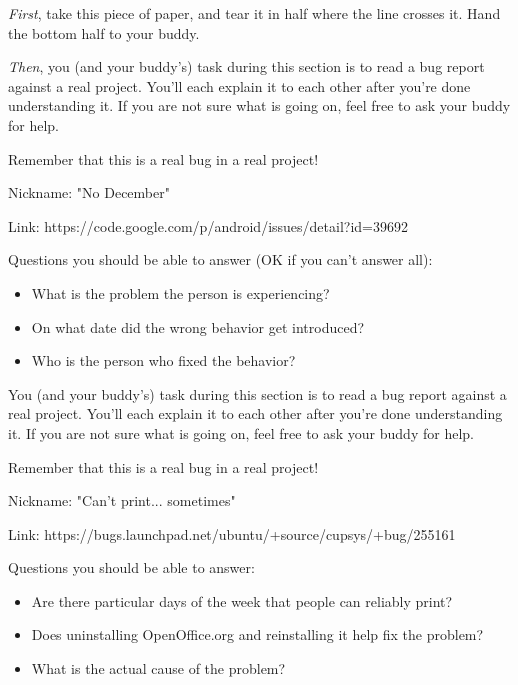 \documentclass[12pt]{article}
\begin{document}
\emph{First}, take this piece of paper, and tear it in half
where the line crosses it. Hand the bottom half to your buddy.

\emph{Then}, you (and your buddy's) task during this section is to
read a bug report against a real project. You'll each explain it to
each other after you're done understanding it. If you are not sure
what is going on, feel free to ask your buddy for help.

Remember that this is a real bug in a real project!

Nickname: "No December"

Link: https://code.google.com/p/android/issues/detail?id=39692

Questions you should be able to answer (OK if you can't answer all):

\begin{itemize}
\item What is the problem the person is experiencing?
\item On what date did the wrong behavior get introduced?
\item Who is the person who fixed the behavior?
\end{itemize}

\hrulefill

You (and your buddy's) task during this section is to read a bug
report against a real project. You'll each explain it to each other
after you're done understanding it. If you are not sure what is going
on, feel free to ask your buddy for help.

Remember that this is a real bug in a real project!

Nickname: "Can't print... sometimes"

Link: https://bugs.launchpad.net/ubuntu/+source/cupsys/+bug/255161

Questions you should be able to answer:

\begin{itemize}
\item Are there particular days of the week that people can reliably print?
\item Does uninstalling OpenOffice.org and reinstalling it help fix the problem?
\item What is the actual cause of the problem?
\end{itemize}
\end{document}

